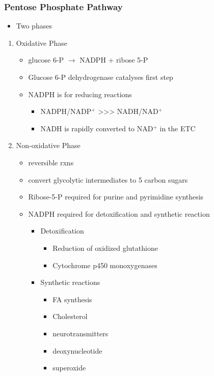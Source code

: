 \documentclass{scrartcl}
\begin{document}
\subsubsection{Pentose Phosphate Pathway}
\label{sec:orga61cb79}
\begin{itemize}
\item Two phases
\end{itemize}
\begin{enumerate}
\item Oxidative Phase
\label{sec:org56103e0}
\begin{itemize}
\item glucose 6-P \(\to\) NADPH + ribose 5-P
\item Glucose 6-P dehydrogenase catalyses first step
\item NADPH is for reducing reactions
\begin{itemize}
\item NADPH/NADP\(^{\text{+}}\) \textgreater{}\textgreater{}\textgreater{} NADH/NAD\(^{\text{+}}\)
\item NADH is rapidly converted to NAD\(^{\text{+}}\) in the ETC
\end{itemize}
\end{itemize}
\item Non-oxidative Phase
\label{sec:org3365fa7}
\begin{itemize}
\item reversible rxns
\item convert glycolytic intermediates to 5 carbon sugars

\item Ribose-5-P required for purine and pyrimidine synthesis
\item NADPH required for detoxification and synthetic reaction
\begin{itemize}
\item Detoxification
\begin{itemize}
\item Reduction of oxidized glutathione
\item Cytochrome p450 monoxygenases
\end{itemize}
\item Synthetic reactions
\begin{itemize}
\item FA synthesis
\item Cholesterol
\item neurotransmitters
\item deoxynucleotide
\item superoxide
\end{itemize}
\end{itemize}
\end{itemize}
\end{enumerate}
\end{document}
